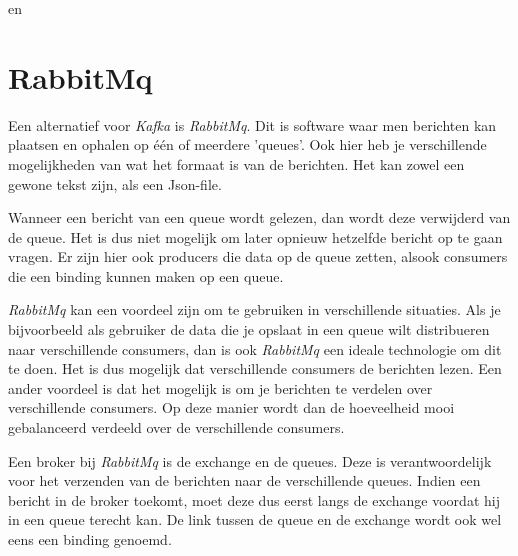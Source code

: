 \autocite{Sookocheff2015} en \autocite{Johansson2016}

\section{RabbitMq}

Een alternatief voor \emph{Kafka} is \emph{RabbitMq}. Dit is software waar men berichten kan plaatsen en ophalen op één of meerdere 'queues'. Ook hier heb je verschillende mogelijkheden van wat het formaat is van de berichten. Het kan zowel een gewone tekst zijn, als een Json-file. 

Wanneer een bericht van een queue wordt gelezen, dan wordt deze verwijderd van de queue. Het is dus niet mogelijk om later opnieuw hetzelfde bericht op te gaan vragen. Er zijn hier ook producers die data op de queue zetten, alsook consumers die een binding kunnen maken op een queue. 

\emph{RabbitMq} kan een voordeel zijn om te gebruiken in verschillende situaties. Als je bijvoorbeeld als gebruiker de data die je opslaat in een queue wilt distribueren naar verschillende consumers, dan is ook \emph{RabbitMq} een ideale technologie om dit te doen. Het is dus mogelijk dat verschillende consumers de berichten lezen. Een ander voordeel is dat het mogelijk is om je berichten te verdelen over verschillende consumers. Op deze manier wordt dan de hoeveelheid mooi gebalanceerd verdeeld over de verschillende consumers.

Een broker bij \emph{RabbitMq} is de exchange en de queues. Deze is verantwoordelijk voor het verzenden van de berichten naar de verschillende queues. Indien een bericht in de broker toekomt, moet deze dus eerst langs de exchange voordat hij in een queue terecht kan. De link tussen de queue en de exchange wordt ook wel eens een binding genoemd.

